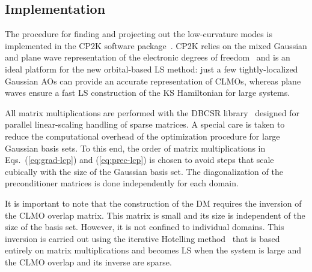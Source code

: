 \documentclass[aps,prl,twocolumn,reprint,amsmath,amssymb]{revtex4-1}
\begin{document}


\subsection{Implementation}

The procedure for finding and projecting out the low-curvature modes is implemented in the CP2K software package~\cite{cp2kgeneral}. CP2K relies on the mixed Gaussian and plane wave representation of the electronic degrees of freedom~\cite{vandevondele2005quickstep} and is an ideal platform for the new orbital-based LS method: just a few tightly-localized Gaussian AOs can provide an accurate representation of CLMOs, whereas plane waves ensure a fast LS construction of the KS Hamiltonian for large systems.

All matrix multiplications are performed with the DBCSR library~\cite{borvstnik2014sparse} designed for parallel linear-scaling handling of sparse matrices. 
A special care is taken to reduce the computational overhead of the optimization procedure for large Gaussian basis sets. 
To this end, the order of matrix multiplications in Eqs.~(\ref{eq:grad-lcp}) and (\ref{eq:prec-lcp}) is chosen to avoid steps that scale cubically with the size of the Gaussian basis set. 
The diagonalization of the preconditioner matrices is done independently for each domain. 

It is important to note that the construction of the DM requires the inversion of the CLMO overlap matrix. 
This matrix is small and its size is independent of the size of the basis set. 
However, it is not confined to individual domains. This inversion is carried out using the iterative Hotelling method~\cite{hotelling1943some} that is based entirely on matrix multiplications and becomes LS when the system is large and the CLMO overlap and its inverse are sparse. 
\end{document}
